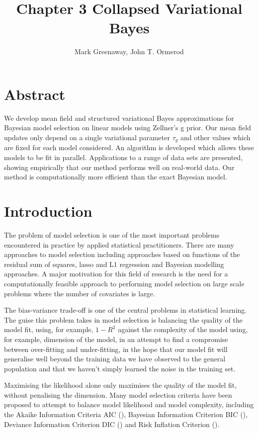 \documentclass{amsart}[12pt]
\title{Chapter 3 Collapsed Variational Bayes}
\author{Mark Greenaway, John T. Ormerod}
\begin{document}
\maketitle

\section*{Abstract}


We develop mean field and structured variational Bayes approximations for Bayesian model selection on linear
models using Zellner's g prior. Our mean field updates only depend on a single variational parameter $\tau_g$
and other values which are fixed for each model considered. An algorithm is developed which allows these
models to be fit in parallel. Applications to a range of data sets are presented, showing  empirically that
our method performs well on real-world data. Our method is computationally more efficient  than the exact
Bayesian model.

\section{Introduction}

The problem of model selection is one of the most important problems encountered in practice by applied
statistical practitioners. There are many approaches to model selection including approaches based on
functions of the residual sum of squares, lasso and L1 regression and Bayesian modelling approaches. A major
motivation for this field of research is the need for a computationally feasible approach to performing model
selection on large scale problems where the number of covariates is large.

The bias-variance trade-off is one of the central problems in statistical learning. The guise this problem
takes in model selection is balancing the quality of the model fit, using, for example, $1 - R^2$ against the
complexity of the model using, for example, dimension of the model, in an attempt to find a compromise between
over-fitting and under-fitting, in the hope that our model fit will generalise well beyond the training data
we have observed to the general population and that we haven't simply learned the noise in the training set.

Maximising the likelihood alone only maximises the quality of the model fit, without penalising the dimension.
Many model selection criteria have been proposed to attempt to balance model likelihood and model complexity,
including the Akaike Information Criteria AIC (\cite{DeLeeuw1992}), Bayesian Information Criterion BIC
(\cite{Schwarz1978}), Deviance Information Criterion DIC (\cite{Spiegelhalter2016}) and Risk Inflation
Criterion (\cite{Foster1994}).
\end{document}
